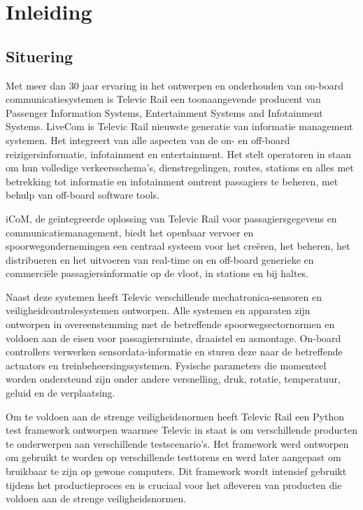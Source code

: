 \chapter{Inleiding}\label{hfdst:situering}
\section{Situering}
Met meer dan 30 jaar ervaring in het ontwerpen en onderhouden van on-board communicatiesystemen is Televic Rail een toonaangevende producent van Passenger Information Systems, Entertainment Systems and Infotainment Systems.
LiveCom is Televic Rail nieuwste generatie van informatie management systemen.
Het integreert van alle aspecten van de on- en off-board reizigersinformatie, infotainment en entertainment. 
Het stelt operatoren in staan om hun volledige verkeersschema's, dienstregelingen, routes, stations en alles met betrekking tot informatie en infotainment omtrent passagiers te beheren, met behulp van off-board software tools.

iCoM, de geïntegreerde oplossing van Televic Rail voor passagiersgegevens en communicatiemanagement, biedt het openbaar vervoer en spoorwegondernemingen een centraal systeem voor het creëren, het beheren, het distribueren en het uitvoeren van real-time on en off-board generieke en commerciële passagiersinformatie op de vloot, in stations en bij haltes.

Naast deze systemen heeft Televic verschillende mechatronica-sensoren en veiligheidcontrolesystemen ontworpen.
Alle systemen en apparaten zijn ontworpen in overeenstemming met de betreffende spoorwegsectornormen en voldoen aan de eisen voor passagiersruimte, draaistel en asmontage. 
On-board controllers verwerken sensordata-informatie en sturen deze naar de betreffende actuators en treinbeheersingssystemen.
Fysische parameters die momenteel worden ondersteund zijn onder andere versnelling, druk, rotatie, temperatuur, geluid en de verplaatsing.

Om te voldoen aan de strenge veiligheidsnormen heeft Televic Rail een Python test framework ontworpen waarmee Televic in staat is om verschillende producten te onderwerpen aan verschillende testscenario's.
Het framework werd ontworpen om gebruikt te worden op verschillende testtorens en werd later aangepast om bruikbaar te zijn op gewone computers.
Dit framework wordt intensief gebruikt tijdens het productieproces en is cruciaal voor het afleveren van producten die voldoen aan de strenge veiligheidsnormen.

